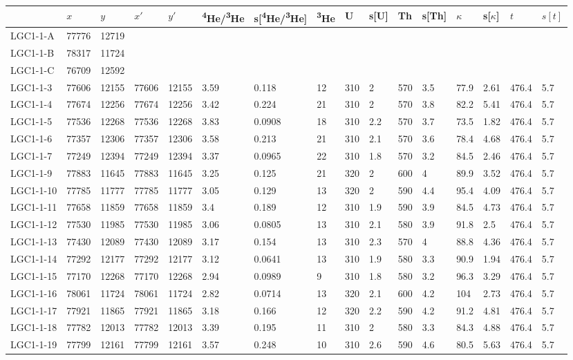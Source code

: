 \addtolength\tabcolsep{-0.05em}
\begin{longtable*}{@{}l@{~~}l@{~~}l@{~~}l@{~~}l@{~~}l@{~~}l@{~~}l@{~~}l@{~~}l@{~~}l@{~~}l@{~~}l@{~~}l@{~~}l@{~~}l@{}}
&$x$&$y$&$x'$&$y'$&\textsuperscript{4}He/\textsuperscript{3}He&s[\textsuperscript{4}He/\textsuperscript{3}He]&\textsuperscript{3}He&U&s[U]&Th&s[Th]&$\kappa$&s[$\kappa$]&$t$&$s[t]$\\ \hline
\endhead
LGC1-1-A&77776&12719&&&&&&&&&&&&&\\
LGC1-1-B&78317&11724&&&&&&&&&&&&&\\
LGC1-1-C&76709&12592&&&&&&&&&&&&&\\
LGC1-1-3&77606&12155&77606&12155&3.59&0.118&12&310&2&570&3.5&77.9&2.61&476.4&5.7\\
LGC1-1-4&77674&12256&77674&12256&3.42&0.224&21&310&2&570&3.8&82.2&5.41&476.4&5.7\\
LGC1-1-5&77536&12268&77536&12268&3.83&0.0908&18&310&2.2&570&3.7&73.5&1.82&476.4&5.7\\
LGC1-1-6&77357&12306&77357&12306&3.58&0.213&21&310&2.1&570&3.6&78.4&4.68&476.4&5.7\\
LGC1-1-7&77249&12394&77249&12394&3.37&0.0965&22&310&1.8&570&3.2&84.5&2.46&476.4&5.7\\
LGC1-1-9&77883&11645&77883&11645&3.25&0.125&21&320&2&600&4&89.9&3.52&476.4&5.7\\
LGC1-1-10&77785&11777&77785&11777&3.05&0.129&13&320&2&590&4.4&95.4&4.09&476.4&5.7\\
LGC1-1-11&77658&11859&77658&11859&3.4&0.189&12&310&1.9&590&3.9&84.5&4.73&476.4&5.7\\
LGC1-1-12&77530&11985&77530&11985&3.06&0.0805&13&310&2.1&580&3.9&91.8&2.5&476.4&5.7\\
LGC1-1-13&77430&12089&77430&12089&3.17&0.154&13&310&2.3&570&4&88.8&4.36&476.4&5.7\\
LGC1-1-14&77292&12177&77292&12177&3.12&0.0641&13&310&1.9&580&3.3&90.9&1.94&476.4&5.7\\
LGC1-1-15&77170&12268&77170&12268&2.94&0.0989&9&310&1.8&580&3.2&96.3&3.29&476.4&5.7\\
LGC1-1-16&78061&11724&78061&11724&2.82&0.0714&13&320&2.1&600&4.2&104&2.73&476.4&5.7\\
LGC1-1-17&77921&11865&77921&11865&3.18&0.166&12&320&2.2&590&4.2&91.2&4.81&476.4&5.7\\
LGC1-1-18&77782&12013&77782&12013&3.39&0.195&11&310&2&580&3.3&84.3&4.88&476.4&5.7\\
LGC1-1-19&77799&12161&77799&12161&3.57&0.248&10&310&2.6&590&4.6&80.5&5.63&476.4&5.7\\

\end{longtable*}
